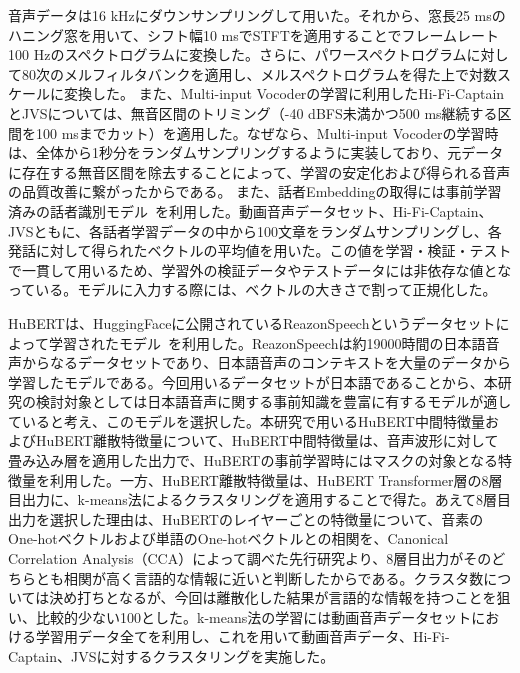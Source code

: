 \documentclass[12pt]{jarticle}
\numberwithin{equation}{section}    %
\numberwithin{figure}{section}      %
\numberwithin{table}{section}      %
\begin{document}
音声データは16 kHzにダウンサンプリングして用いた。それから、窓長25 msのハニング窓を用いて、シフト幅10 msでSTFTを適用することでフレームレート100 Hzのスペクトログラムに変換した。さらに、パワースペクトログラムに対して80次のメルフィルタバンクを適用し、メルスペクトログラムを得た上で対数スケールに変換した。
また、Multi-input Vocoderの学習に利用したHi-Fi-CaptainとJVSについては、無音区間のトリミング（-40 dBFS未満かつ500 ms継続する区間を100 msまでカット）を適用した。なぜなら、Multi-input Vocoderの学習時は、全体から1秒分をランダムサンプリングするように実装しており、元データに存在する無音区間を除去することによって、学習の安定化および得られる音声の品質改善に繋がったからである。
また、話者Embeddingの取得には事前学習済みの話者識別モデル~\cite{wan2018generalized}を利用した。動画音声データセット、Hi-Fi-Captain、JVSともに、各話者学習データの中から100文章をランダムサンプリングし、各発話に対して得られたベクトルの平均値を用いた。この値を学習・検証・テストで一貫して用いるため、学習外の検証データやテストデータには非依存な値となっている。モデルに入力する際には、ベクトルの大きさで割って正規化した。

HuBERTは、HuggingFaceに公開されているReazonSpeechというデータセットによって学習されたモデル~\cite{rinna-japanese-hubert-base,sawada2024release}を利用した。ReazonSpeechは約19000時間の日本語音声からなるデータセットであり、日本語音声のコンテキストを大量のデータから学習したモデルである。今回用いるデータセットが日本語であることから、本研究の検討対象としては日本語音声に関する事前知識を豊富に有するモデルが適していると考え、このモデルを選択した。本研究で用いるHuBERT中間特徴量およびHuBERT離散特徴量について、HuBERT中間特徴量は、音声波形に対して畳み込み層を適用した出力で、HuBERTの事前学習時にはマスクの対象となる特徴量を利用した。一方、HuBERT離散特徴量は、HuBERT Transformer層の8層目出力に、k-means法によるクラスタリングを適用することで得た。あえて8層目出力を選択した理由は、HuBERTのレイヤーごとの特徴量について、音素のOne-hotベクトルおよび単語のOne-hotベクトルとの相関を、Canonical Correlation Analysis（CCA）によって調べた先行研究\cite{pasad2023comparative}より、8層目出力がそのどちらとも相関が高く言語的な情報に近いと判断したからである。クラスタ数については決め打ちとなるが、今回は離散化した結果が言語的な情報を持つことを狙い、比較的少ない100とした。k-means法の学習には動画音声データセットにおける学習用データ全てを利用し、これを用いて動画音声データ、Hi-Fi-Captain、JVSに対するクラスタリングを実施した。
\end{document}

